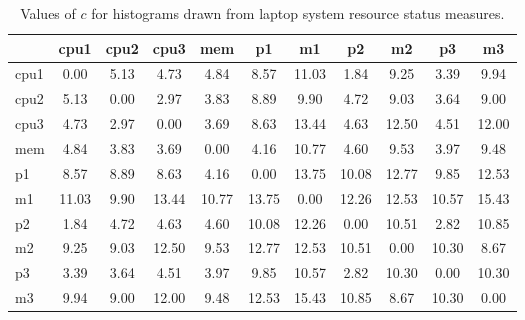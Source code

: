 \begin{table}[h!]
\begin{center}
\begin{tabular}{| l | c | c | c | c | c | c | c | c | c | c |}\hline
 & cpu1 & cpu2 & cpu3 & mem & p1 & m1 & p2 & m2 & p3 & m3 \\\hline
cpu1 & 0.00  & 5.13  & 4.73  & 4.84  & 8.57  & 11.03  & 1.84  & 9.25  & 3.39  & 9.94 \\\hline
cpu2 & 5.13  & 0.00  & 2.97  & 3.83  & 8.89  & 9.90  & 4.72  & 9.03  & 3.64  & 9.00 \\\hline
cpu3 & 4.73  & 2.97  & 0.00  & 3.69  & 8.63  & 13.44  & 4.63  & 12.50  & 4.51  & 12.00 \\\hline
mem & 4.84  & 3.83  & 3.69  & 0.00  & 4.16  & 10.77  & 4.60  & 9.53  & 3.97  & 9.48 \\\hline
p1 & 8.57  & 8.89  & 8.63  & 4.16  & 0.00  & 13.75  & 10.08  & 12.77  & 9.85  & 12.53 \\\hline
m1 & 11.03  & 9.90  & 13.44  & 10.77  & 13.75  & 0.00  & 12.26  & 12.53  & 10.57  & 15.43 \\\hline
p2 & 1.84  & 4.72  & 4.63  & 4.60  & 10.08  & 12.26  & 0.00  & 10.51  & 2.82  & 10.85 \\\hline
m2 & 9.25  & 9.03  & 12.50  & 9.53  & 12.77  & 12.53  & 10.51  & 0.00  & 10.30  & 8.67 \\\hline
p3 & 3.39  & 3.64  & 4.51  & 3.97  & 9.85  & 10.57  & 2.82  & 10.30  & 0.00  & 10.30 \\\hline
m3 & 9.94  & 9.00  & 12.00  & 9.48  & 12.53  & 15.43  & 10.85  & 8.67  & 10.30  & 0.00 \\\hline
\end{tabular}
\caption{Values of $c$ for histograms drawn from laptop system resource status measures.}
\end{center}
\end{table}